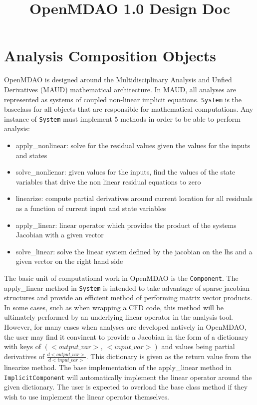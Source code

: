 \documentclass[12pt]{article}
\title {OpenMDAO 1.0 Design Doc}
\newcommand{\classname}[1]{\texttt{#1}}
\begin{document}
\maketitle

\section{Analysis Composition Objects}

OpenMDAO is designed around the Multidisciplinary Analysis and Unfied Derivatives (MAUD) mathematical
architecture. In MAUD, all analyses are represented as systems of coupled non-linear implicit equations.
\classname{System} is the baseclass for all objects that are responsible for mathematical computations.
Any instance of \classname{System} must implement 5 methods in order to be able to perform
analysis:

\begin{itemize}
    \item apply\_nonlinear: solve for the residual values given the values for
    the inputs and states
    \item solve\_nonlienar: given values for the inputs, find the values of the
    state variables that drive the non linear residual equations to zero
    \item linearize: compute partial derivatives around current location for all
    residuals as a function of current input and state variables
    \item apply\_linear: linear operator which provides the product of the systems
    Jacobian with a given vector
    \item solve\_linear: solve the linear system defined by the jacobian on the
    lhs and a given vector on the right hand side
\end{itemize}



The basic unit of computational work in OpenMDAO is the \classname{Component}.
The apply\_linear method in \classname{System} is intended to take advantage of sparse jacobian
structures and provide an efficient method of performing matrix vector products. In some cases,
such as when wrapping a CFD code, this method will be ultimately performed by an underlying
linear operator in the analysis tool. However, for many cases when analyses are developed natively in
OpenMDAO, the user may find it convinent to provide a Jacobian in the form of a dictionary with
keys of $(<output\_var>,\ <input\_var>)$ and values being partial derivatives of
$\frac{d<output\_var>}{d<input\_var>}$. This dictionary is given as the return value
from the linearize method. The base implementation of the apply\_linear method
in \classname{ImplicitComponent} will automatically implement the linear operator around
the given dictionary. The user is expected to overload the base class method if they wish to
use implement the linear operator themselves.
\end{document}
